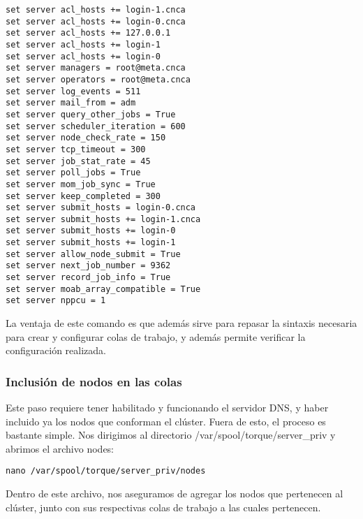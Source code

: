 \begin{lstlisting}
set server acl_hosts += login-1.cnca
set server acl_hosts += login-0.cnca
set server acl_hosts += 127.0.0.1
set server acl_hosts += login-1
set server acl_hosts += login-0
set server managers = root@meta.cnca
set server operators = root@meta.cnca
set server log_events = 511
set server mail_from = adm
set server query_other_jobs = True
set server scheduler_iteration = 600
set server node_check_rate = 150
set server tcp_timeout = 300
set server job_stat_rate = 45
set server poll_jobs = True
set server mom_job_sync = True
set server keep_completed = 300
set server submit_hosts = login-0.cnca
set server submit_hosts += login-1.cnca
set server submit_hosts += login-0
set server submit_hosts += login-1
set server allow_node_submit = True
set server next_job_number = 9362
set server record_job_info = True
set server moab_array_compatible = True
set server nppcu = 1
\end{lstlisting}

La ventaja de este comando es que además sirve para repasar la sintaxis necesaria para crear y configurar colas de trabajo, y además permite verificar la configuración realizada.

\subsubsection{Inclusión de nodos en las colas}
Este paso requiere tener habilitado y funcionando el servidor DNS, y haber incluido ya los nodos que conforman el clúster. Fuera de esto, el proceso es bastante simple. Nos dirigimos al directorio /var/spool/torque/server\_priv y abrimos el archivo nodes:

\begin{lstlisting}
nano /var/spool/torque/server_priv/nodes
\end{lstlisting}

Dentro de este archivo, nos aseguramos de agregar los nodos que pertenecen al clúster, junto con sus respectivas colas de trabajo a las cuales pertenecen.

